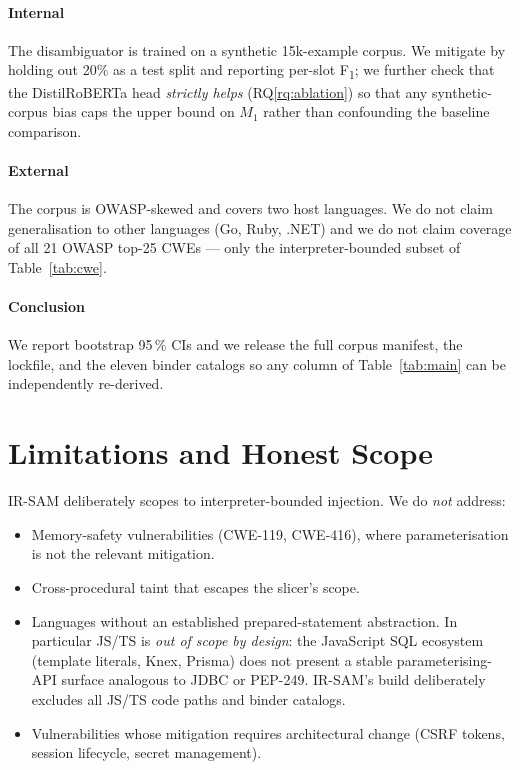 \documentclass[conference]{IEEEtran}
\newcommand{\IRSAM}{\textsc{IR-SAM}}
\newcommand{\rqref}[1]{RQ\ref{rq:#1}}
\begin{document}
\paragraph*{Internal}
The disambiguator is trained on a synthetic 15k-example corpus.  We
mitigate by holding out 20\% as a test split and reporting per-slot
F\textsubscript{1}; we further check that the DistilRoBERTa head
\emph{strictly helps} (\rqref{ablation}) so that any synthetic-corpus
bias caps the upper bound on $M_1$ rather than confounding the
baseline comparison.

\paragraph*{External}
The corpus is OWASP-skewed and covers two host languages. We do not
claim generalisation to other languages (Go, Ruby, .NET) and we do
not claim coverage of all 21 OWASP top-25 CWEs --- only the
interpreter-bounded subset of Table~\ref{tab:cwe}.

\paragraph*{Conclusion}
We report bootstrap 95\,\% CIs and we release the full corpus
manifest, the lockfile, and the eleven binder catalogs so any
column of Table~\ref{tab:main} can be independently re-derived.

\section{Limitations and Honest Scope}\label{sec:limits}

\IRSAM{} deliberately scopes to interpreter-bounded injection. We
do \emph{not} address:
\begin{itemize}[leftmargin=*]
\item Memory-safety vulnerabilities (CWE-119, CWE-416), where
      parameterisation is not the relevant mitigation.
\item Cross-procedural taint that escapes the slicer's scope.
\item Languages without an established prepared-statement
      abstraction.  In particular JS/TS is \emph{out of scope by
      design}: the JavaScript SQL ecosystem (template literals,
      Knex, Prisma) does not present a stable
      parameterising-API surface analogous to JDBC or PEP-249.
      \IRSAM{}'s build deliberately excludes all JS/TS code paths
      and binder catalogs.
\item Vulnerabilities whose mitigation requires architectural
      change (CSRF tokens, session lifecycle, secret management).
\end{itemize}
\end{document}

